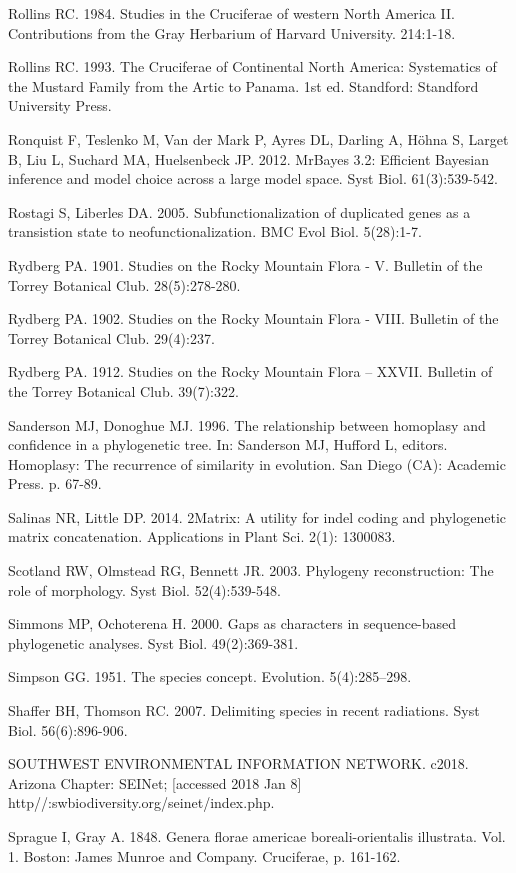 Rollins RC. 1984. Studies in the Cruciferae of western North America II. Contributions from the Gray Herbarium of Harvard University. 214:1-18.

Rollins RC. 1993. The Cruciferae of Continental North America: Systematics of the Mustard Family from the Artic to Panama. 1st ed. Standford: Standford University Press.

Ronquist F, Teslenko M, Van der Mark P, Ayres DL, Darling A, Höhna S, Larget B, Liu L, Suchard MA, Huelsenbeck JP. 2012. MrBayes 3.2: Efficient Bayesian inference and model choice across a large model space. Syst Biol. 61(3):539-542.

Rostagi S, Liberles DA. 2005. Subfunctionalization of duplicated genes as a transistion state to neofunctionalization. BMC Evol Biol. 5(28):1-7.

Rydberg PA. 1901. Studies on the Rocky Mountain Flora - V. Bulletin of the Torrey Botanical Club. 28(5):278-280.

Rydberg PA. 1902. Studies on the Rocky Mountain Flora - VIII. Bulletin of the Torrey Botanical Club. 29(4):237.

Rydberg PA. 1912. Studies on the Rocky Mountain Flora – XXVII. Bulletin of the Torrey Botanical Club. 39(7):322.

Sanderson MJ, Donoghue MJ. 1996. The relationship between homoplasy and confidence in a phylogenetic tree. In: Sanderson MJ, Hufford L, editors. Homoplasy: The recurrence of similarity in evolution. San Diego (CA): Academic Press. p. 67-89. 

Salinas NR, Little DP. 2014. 2Matrix: A utility for indel coding and phylogenetic matrix concatenation. Applications in Plant Sci. 2(1): 1300083.

Scotland RW, Olmstead RG, Bennett JR. 2003. Phylogeny reconstruction: The role of morphology. Syst Biol. 52(4):539-548.

Simmons MP, Ochoterena H. 2000. Gaps as characters in sequence-based phylogenetic analyses. Syst Biol. 49(2):369-381.

Simpson GG. 1951. The species concept. Evolution. 5(4):285–298.

Shaffer BH, Thomson RC. 2007. Delimiting species in recent radiations. Syst Biol. 56(6):896-906.

SOUTHWEST ENVIRONMENTAL INFORMATION NETWORK. c2018. Arizona Chapter: SEINet; [accessed 2018 Jan 8] http//:swbiodiversity.org/seinet/index.php.

Sprague I, Gray A. 1848. Genera florae americae boreali-orientalis illustrata.  Vol. 1. Boston: James Munroe and Company. Cruciferae, p. 161-162.  

